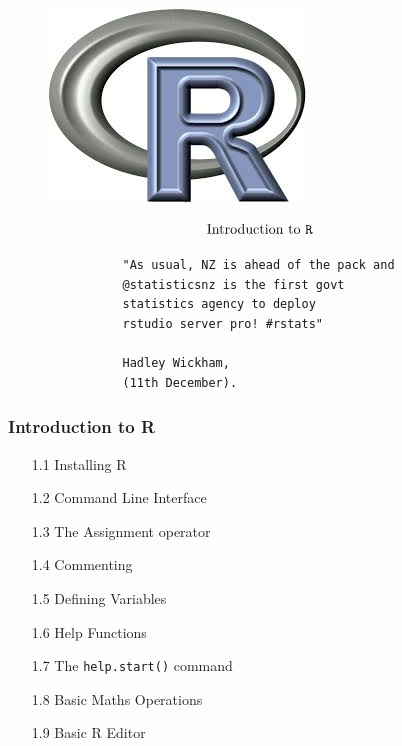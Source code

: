 \documentclass{beamer}
\begin{document}
 	\begin{frame}
 		\begin{figure}
 			\centering
 			\includegraphics[width=0.7\linewidth]{Rlogo}
 		\end{figure}
 		\LARGE
 		\[ \mbox{Introduction to \texttt{R}} \]	
 		
 		
 		
 	\end{frame}

 
 	 	\begin{frame}[fragile]
 	 		\Large
 	 		\begin{framed}
 	 			\begin{verbatim}
 	 			"As usual, NZ is ahead of the pack and 
 	 			@statisticsnz is the first govt 
 	 			statistics agency to deploy 
 	 			rstudio server pro! #rstats"
 	 			
 	 			Hadley Wickham, 
 	 			(11th December).
 	 			\end{verbatim}
 	 		\end{framed}
 	 		
 	 	\end{frame}
 	 	
 	
 	\begin{frame}
 		\frametitle{Introduction to R}
 		\begin{itemize}
 			\item[1.1] Installing R      
 			\item[1.2] Command Line Interface     
 			\item[1.3] The Assignment operator     
 			\item[1.4] Commenting      
 			\item[1.5] Defining Variables     
 			\item[1.6] Help Functions      
 			\item[1.7] The \texttt{help.start()} command     
 			\item[1.8] Basic Maths Operations     
 			\item[1.9] Basic R Editor      
 		\end{itemize}
 	\end{frame}
\end{document}
